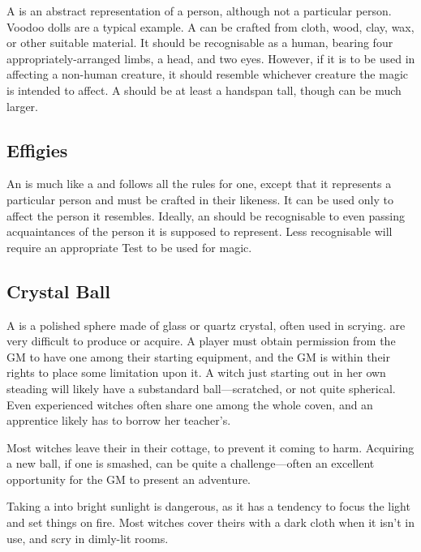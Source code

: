 A  is an abstract representation of a person, although not a particular person.
Voodoo dolls are a typical example.
A  can be crafted from cloth, wood, clay, wax, or other suitable material.
It should be recognisable as a human, bearing four appropriately-arranged limbs, a head, and two eyes.
However, if it is to be used in  affecting a non-human creature, it should resemble whichever creature the magic is intended to affect.
A  should be at least a handspan tall, though can be much larger.

\subsection{Effigies}

An  is much like a  and follows all the rules for one, except that it represents a particular person and must be crafted in their likeness.
It can be used only to affect the person it resembles.
Ideally, an  should be recognisable to even passing acquaintances of the person it is supposed to represent.
Less recognisable  will require an appropriate Test to be used for magic.

\subsection{Crystal Ball}

A  is a polished sphere made of glass or quartz crystal, often used in scrying.
 are very difficult to produce or acquire.
A player must obtain permission from the GM to have one among their starting equipment, and the GM is within their rights to place some limitation upon it.
A witch just starting out in her own steading will likely have a substandard ball---scratched, or not quite spherical.
Even experienced witches often share one among the whole coven, and an apprentice likely has to borrow her teacher's.

Most witches leave their  in their cottage, to prevent it coming to harm.
Acquiring a new ball, if one is smashed, can be quite a challenge---often an excellent opportunity for the GM to present an adventure.

Taking a  into bright sunlight is dangerous, as it has a tendency to focus the light and set things on fire.
Most witches cover theirs with a dark cloth when it isn't in use, and scry in dimly-lit rooms.


